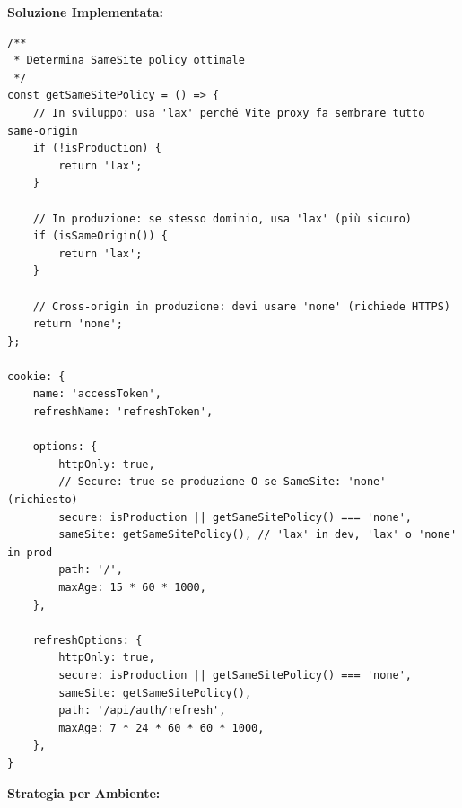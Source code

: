 \documentclass[11pt,a4paper]{article}
\begin{document}
\textbf{Soluzione Implementata:}

\begin{lstlisting}[caption=Configurazione Cookie Intelligente]
/**
 * Determina SameSite policy ottimale
 */
const getSameSitePolicy = () => {
    // In sviluppo: usa 'lax' perché Vite proxy fa sembrare tutto same-origin
    if (!isProduction) {
        return 'lax';
    }
    
    // In produzione: se stesso dominio, usa 'lax' (più sicuro)
    if (isSameOrigin()) {
        return 'lax';
    }
    
    // Cross-origin in produzione: devi usare 'none' (richiede HTTPS)
    return 'none';
};

cookie: {
    name: 'accessToken',
    refreshName: 'refreshToken',
    
    options: {
        httpOnly: true,
        // Secure: true se produzione O se SameSite: 'none' (richiesto)
        secure: isProduction || getSameSitePolicy() === 'none',
        sameSite: getSameSitePolicy(), // 'lax' in dev, 'lax' o 'none' in prod
        path: '/',
        maxAge: 15 * 60 * 1000,
    },
    
    refreshOptions: {
        httpOnly: true,
        secure: isProduction || getSameSitePolicy() === 'none',
        sameSite: getSameSitePolicy(),
        path: '/api/auth/refresh',
        maxAge: 7 * 24 * 60 * 60 * 1000,
    },
}
\end{lstlisting}

\textbf{Strategia per Ambiente:}
\end{document}
